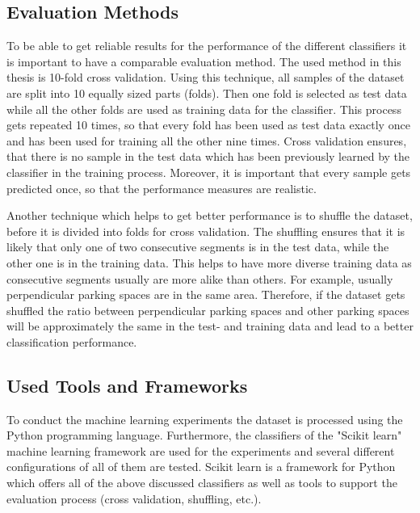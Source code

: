 \subsection{Evaluation Methods}
\label{sec:evaluation_methods}

To be able to get reliable results for the performance of the different classifiers it is important to have a comparable evaluation method. The used method in this thesis is 10-fold cross validation. Using this technique, all samples of the dataset are split into 10 equally sized parts (folds). Then one fold is selected as test data while all the other folds are used as training data for the classifier. This process gets repeated 10 times, so that every fold has been used as test data exactly once and has been used for training all the other nine times. Cross validation ensures, that there is no sample in the test data which has been previously learned by the classifier in the training process. Moreover, it is important that every sample gets predicted once, so that the performance measures are realistic.

Another technique which helps to get better performance is to shuffle the dataset, before it is divided into folds for cross validation. The shuffling ensures that it is likely that only one of two consecutive segments is in the test data, while the other one is in the training data. This helps to have more diverse training data as consecutive segments usually are more alike than others. For example, usually perpendicular parking spaces are in the same area. Therefore, if the dataset gets shuffled the ratio between perpendicular parking spaces and other parking spaces will be approximately the same in the test- and training data and lead to a better classification performance.



\subsection{Used Tools and Frameworks}

To conduct the machine learning experiments the dataset is processed using the Python programming language. Furthermore, the classifiers of the "Scikit learn" machine learning framework are used for the experiments and several different configurations of all of them are tested. Scikit learn is a framework for Python which offers all of the above discussed classifiers as well as tools to support the evaluation process (cross validation, shuffling, etc.).

